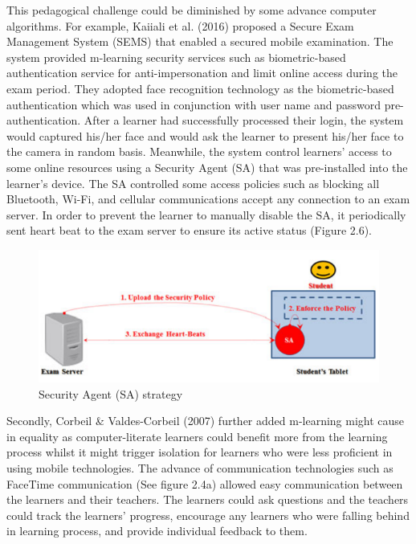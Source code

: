 This pedagogical challenge could be diminished by some advance computer algorithms. For example, Kaiiali et al. (2016) \cite{kaiiali2016designing} proposed a Secure Exam Management System (SEMS) that enabled a secured mobile examination. The system provided m-learning security services such as biometric-based authentication service for anti-impersonation and limit online access during the exam period. They adopted face recognition technology as the biometric-based authentication which was used in conjunction with user name and password pre-authentication. After a learner had successfully processed their login, the system would captured his/her face and would ask the learner to present his/her face to the camera in random basis. Meanwhile, the system control learners' access to some online resources using a Security Agent (SA) that was pre-installed into the learner's device. The SA controlled some access policies such as blocking all Bluetooth, Wi-Fi, and cellular communications accept any connection to an exam server. In order to prevent the learner to manually disable the SA, it periodically sent heart beat to the exam server to ensure its active status (Figure 2.6). 

\begin{figure}[!hbt]\centering
 \includegraphics[width=\textwidth]{cha7}
    \caption{Security Agent (SA) strategy \cite{kaiiali2016designing}}
\end{figure}

Secondly, Corbeil \& Valdes-Corbeil (2007) \cite{corbeil2007you} further added m-learning might cause in equality as computer-literate learners could benefit more from the learning process whilst it might trigger isolation for learners who were less proficient in using mobile technologies. The advance of communication technologies such as FaceTime communication (See figure 2.4a) allowed easy communication between the learners and their teachers. The learners could ask questions and the teachers could track the learners' progress, encourage any learners who were falling behind in learning process, and provide individual feedback to them. 


